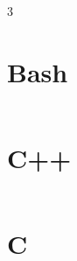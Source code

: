 \documentclass[a4paper, landscape]{article}
\begin{document}
\begin{multicols*}{3}
    \section*{Bash}
    \inputminted{bash}{./src.sh}
    \section*{C++}
    \inputminted[obeytabs=true]{cpp}{./src.cpp}
    \section*{C}
    \inputminted[obeytabs=true]{c}{./src.c}
\end{multicols*}
\end{document}
